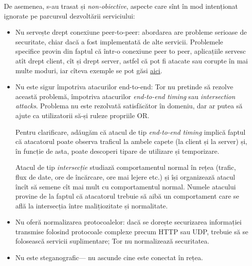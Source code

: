 De asemenea, s-au trasat și \emph{non-obiective}, aspecte care sînt
în mod intenționat ignorate pe parcursul dezvoltării serviciului:
\begin{itemize}
  \item Nu servește drept conexiune peer-to-peer: abordarea are probleme
    serioase de securitate, chiar dacă a fost implementată de alte servicii.
    Problemele specifice provin din faptul că într-o conexiune peer to peer,
    aplicațiile servesc atît drept client, cît și drept server, astfel
    că pot fi atacate sau corupte în mai multe moduri, iar cîteva exemple
    se pot găsi \href{https://www.cse.wustl.edu/~jain/cse571-07/ftp/p2p/#attack}{aici}.
  \item Nu este sigur împotriva atacurilor end-to-end: Tor nu pretinde
    să rezolve această problemă, împotriva atacurilor \emph{end-to-end timing}
    sau \emph{intersection attacks}. Problema nu este rezolvată satisfăcător
    în domeniu, dar ar putea să ajute ca utilizatorii să-și ruleze propriile
    OR.

    Pentru clarificare, adăugăm că atacul de tip \emph{end-to-end timing}
    implică faptul că atacatorul poate observa traficul la ambele capete
    (la client și la server) și, în funcție de asta, poate descoperi tipare de utilizare
    și temporizare.

    Atacul de tip \emph{intersecție} studiază comportamentul normal în rețea (trafic,
    flux de date, ore de încărcare, ore mai lejere etc.) și își organizează atacul
    încît să semene cît mai mult cu comportamentul normal. Numele atacului provine
    de la faptul că atacatorul trebuie să aibă un comportament care se află la intersecția
    între malițiozitate și normalitate.
  \item Nu oferă normalizarea protocoalelor: dacă se dorește securizarea
    informației transmise folosind protocoale complexe precum HTTP sau UDP,
    trebuie să se folosească servicii suplimentare; Tor nu normalizează securitatea.
  \item Nu este steganografic\footnotemark --- nu ascunde cine este conectat în rețea.
\end{itemize}

